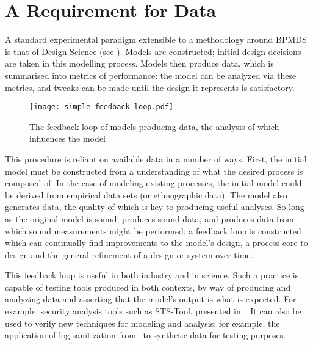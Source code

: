 \documentclass[12pt]{llncs}  %
\begin{document}
\maketitle


\section{A Requirement for Data}
\label{sec:intro}


A standard experimental paradigm extensible to a methodology around BPMDS is
that of Design Science (see \cite{designscience}). Models are constructed; initial
design decisions are taken in this modelling process. Models then produce data,
which is summarised into metrics of performance: the model can be analyzed via
these metrics, and tweaks can be made until the design it represents is
satisfactory.
\par

\begin{figure}[h]
  \centering
  \texttt{[image: simple\_feedback\_loop.pdf]}
  \caption[Feedback loop design]{The feedback loop of models producing data, the
    analysis of which influences the model}
  \label{fig:simple_feedback_loop}
\end{figure}

This procedure is reliant on available data in a number of ways. First, the
initial model must be constructed from a understanding of what the desired
process is composed of. In the case of modeling existing processes, the initial
model could be derived from empirical data sets (or ethnographic data). The
model also generates data, the quality of which is key to producing useful
analyses. So long as the original model is sound, produces sound data, and
produces data from which sound measurements might be performed, a feedback loop
is constructed which can continually find improvements to the model's
design, a process core to design and the general refinement of a design or
system over time. \par

This feedback loop is useful in both industry and in science. Such a practice is
capable of testing tools produced in both contexts, by way of producing and
analyzing data and asserting that the model's output is what is expected. For
example, security analysis tools such as STS-Tool, presented
in~\cite{salnitri2015sts}. It can also be used to verify new techniques for
modeling and analysis: for example, the application of log sanitization
from~\cite{cheng2015process} to synthetic data for testing purposes.
\par
\end{document}
